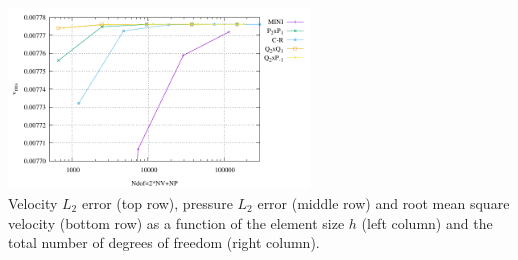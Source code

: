 \begin{center}
\includegraphics[width=8cm]{python_codes/fieldstone_112/results/exp1_rand/vrms_ndof.pdf}\\
{\captionfont Velocity $L_2$ error (top row), pressure $L_2$ error (middle row) and root
mean square velocity (bottom row) as a function of the element size $h$ (left column) 
and the total number of degrees of freedom (right column).}
\end{center}

